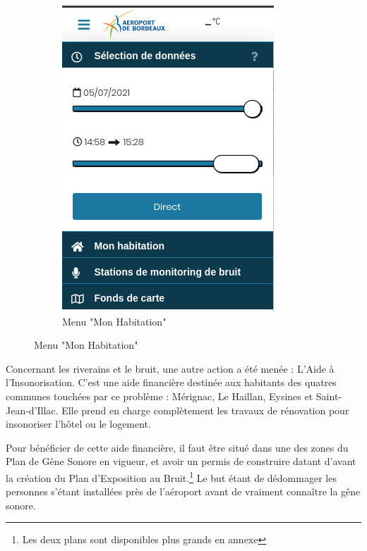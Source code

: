 \begin{figure}[hbt!]
\begin{subfigure}{0.5\textwidth}
    \includegraphics[width=.7\linewidth]{Images/aerovisionmaison.png}  
    \caption{Menu "Mon Habitation"}
    \label{fig:aerovisionmaison}
  \end{subfigure}
\end{figure}

Concernant les riverains et le bruit, une autre action a été menée : L'Aide à l'Insonorisation.
C'est une aide financière destinée aux habitants des quatres communes touchées par ce problème : Mérignac, Le Haillan, Eysines et Saint-Jean-d'Illac. Elle prend en charge complètement les travaux de rénovation pour insonoriser l'hôtel ou le logement.

Pour bénéficier de cette aide financière, il faut être situé dans une des zones du Plan de Gêne Sonore en vigueur, et avoir un permis de construire datant d'avant la création du Plan d'Exposition au Bruit.\footnote{Les deux plans sont disponibles plus grands en annexe}
Le but étant de dédommager les personnes s'étant installées près de l'aéroport avant de vraiment connaître la gêne sonore.

